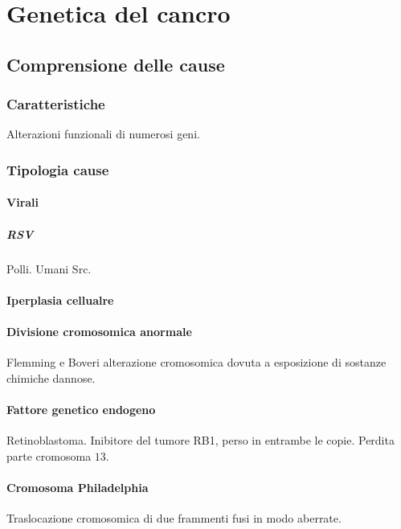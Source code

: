 \chapter{Genetica del cancro}

\section{Comprensione delle cause}

	\subsection{Caratteristiche}
	Alterazioni funzionali di numerosi geni.

	\subsection{Tipologia cause}

		\subsubsection{Virali}

			\paragraph{RSV}
			Polli.
			Umani Src.

		\subsubsection{Iperplasia cellualre}

		\subsubsection{Divisione cromosomica anormale}
		Flemming e Boveri alterazione cromosomica dovuta a esposizione di sostanze chimiche dannose.

		\subsubsection{Fattore genetico endogeno}
		Retinoblastoma.
		Inibitore del tumore RB1, perso in entrambe le copie.
		Perdita parte cromosoma $13$.

		\subsubsection{Cromosoma Philadelphia}
		Traslocazione cromosomica di due frammenti fusi in modo aberrate.

